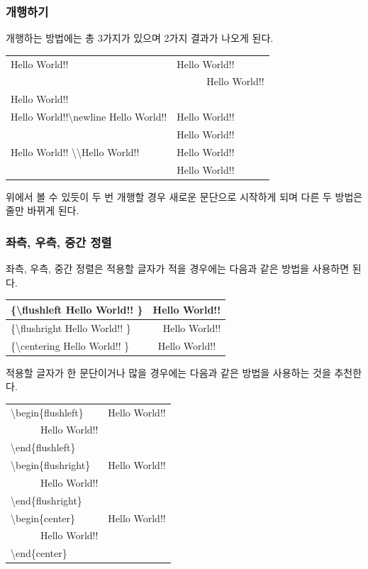 \documentclass[12pt]{article}
\begin{document}
	\subsubsection{개행하기}
	개행하는 방법에는 총 3가지가 있으며 2가지 결과가 나오게 된다.\newline
	
	\begin{tabularx}{\textwidth \onehalfspacing}{|X|X|}
		\hline
		Hello World!! & Hello World!!\\
		\ & \ \ \ \ \ \ Hello World!!\\
		Hello World!! & \\
		\hline
		Hello World!!\textbackslash newline Hello World!! & Hello World!!\\
		\ &Hello World!!\\
		\hline
		Hello World!! \textbackslash \textbackslash Hello World!! & Hello World!!\\
		\ & Hello World!!\\
		\hline
	\end{tabularx}
	\newline
	\newline
	위에서 볼 수 있듯이 두 번 개행할 경우 새로운 문단으로 시작하게 되며 다른 두 방법은 줄만 바뀌게 된다.
	\subsubsection{좌측, 우측, 중간 정렬}
	좌측, 우측, 중간 정렬은 적용할 글자가 적을 경우에는 다음과 같은 방법을 사용하면 된다.\newline
	
	\begin{tabularx}{\textwidth \onehalfspacing}{|X|X|}
		\hline
		\{\textbackslash flushleft Hello World!! \} & Hello World!!\\
		\hline
		\{\textbackslash flushright Hello World!! \} & \multicolumn{1}{r|}{Hello World!!}\\
		\hline
		\{\textbackslash centering Hello World!! \} & \multicolumn{1}{c|}{Hello World!!}\\
		\hline
	\end{tabularx}
	\clearpage
	적용할 글자가 한 문단이거나 많을 경우에는 다음과 같은 방법을 사용하는 것을 추천한다. \newline
	
	\begin{tabularx}{\textwidth \onehalfspacing}{|X|X|}
		\hline
		\textbackslash begin\{flushleft\} & Hello World!!\\
		\ \ \ \ \ \ Hello World!! & \\
		\textbackslash end\{flushleft\} & \\
		\hline
		\textbackslash begin\{flushright\} & \multicolumn{1}{r|}{Hello World!!}\\
		\ \ \ \ \ \ Hello World!! & \\
		\textbackslash end\{flushright\} & \\
		\hline
		\textbackslash begin\{center\} & \multicolumn{1}{c|}{Hello World!!}\\
		\ \ \ \ \ \ Hello World!! & \\
		\textbackslash end\{center\} & \\
		\hline
	\end{tabularx}
\end{document}
